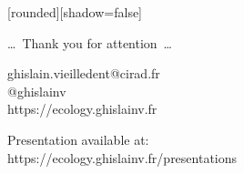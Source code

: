 
{
  [rounded][shadow=false]
  \begin{frame}[plain]
    \begin{block}{}
      \begin{center}
        \ldots~Thank you for attention~\ldots
      \end{center}
    \end{block}
    \vspace{1cm}
    \begin{block}{}
      \begin{center}
        ghislain.vieilledent@cirad.fr\\
        @ghislainv\\
        https://ecology.ghislainv.fr
      \end{center}
    \end{block}
    \vspace{1cm}
    \begin{block}{}
      \begin{center}
				Presentation available at:\\
				https://ecology.ghislainv.fr/presentations
      \end{center}
    \end{block}
  \end{frame}
}